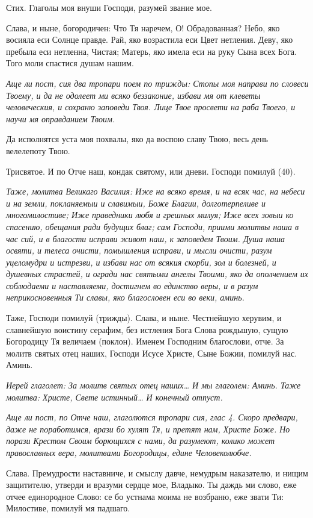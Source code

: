 Стих. Глаголы моя внуши Господи, разумей звание мое.

Слава, и ныне, богородичен: Что Тя наречем, О! Обрадованная? Небо, яко восияла еси Солнце правде. Рай, яко возрастила еси Цвет нетления. Деву, яко пребыла еси нетленна, Чистая; Матерь, яко имела еси на руку Сына всех Бога. Того моли спастися душам нашим.


\itshape Аще ли пост, сия два тропари поем по трижды:\normalfont{} Стопы моя направи по словеси Твоему, и да не одолеет ми всяко беззаконие, избави мя от клеветы человеческия, и сохраню заповеди Твоя. Лице Твое просвети на раба Твоего, и научи мя оправданием Твоим.

Да исполнятся уста моя похвалы, яко да воспою славу Твою, весь день велелепоту Твою. 

Трисвятое. И по Отче наш, кондак святому, или дневи. Господи помилуй (40).


\itshape Таже, молитва Великаго Василия:\normalfont{} Иже на всяко время, и на всяк час, на небеси и на земли, покланяемыи и славимыи, Боже Благии, долготерпеливе и многомилостиве; Иже праведники любя и грешных милуя; Иже всех зовыи ко спасению, обещания ради будущих благ; сам Господи, приими молитвы наша в час сий, и в благости исправи живот наш, к заповедем Твоим. Душа наша освяти, и телеса очисти, помышления исправи, и мысли очисти, разум уцеломудри и истрезви, и избави нас от всякия скорби, зол и болезней, и душевных страстей, и огради нас святыми ангелы Твоими, яко да ополчением их соблюдаеми и наставляеми, достигнем во единство веры, и в разум неприкосновенныя Ти славы, яко благословен еси во веки, аминь. 

Таже, Господи помилуй (трижды). Слава, и ныне. Честнейшую херувим, и славнейшую воистину серафим, без истления Бога Слова рождьшую, сущую Богородицу Тя величаем (поклон). Именем Господним благослови, отче. За молитв святых отец наших, Господи Исусе Христе, Сыне Божии, помилуй нас. Аминь.


\itshape Иерей глаголет:\normalfont{} За молитв святых отец наших… И мы глаголем: Аминь. Таже молитва: Христе, Свете истинный… И конечный отпуст.


\itshape Аще ли пост, по Отче наш, глаголются тропари сия, глас 4.\normalfont{} Скоро предвари, даже не поработимся, врази бо хулят Тя, и претят нам, Христе Боже. Но порази Крестом Своим борющихся с нами, да разумеют, колико может православных вера, молитвами Богородицы, едине Человеколюбче.

Слава. Премудрости наставниче, и смыслу давче, немудрым наказателю, и нищим защитителю, утверди и вразуми сердце мое, Владыко. Ты даждь ми слово, еже отчее единородное Слово: се бо устнама моима не возбраню, еже звати Ти: Милостиве, помилуй мя падшаго.

